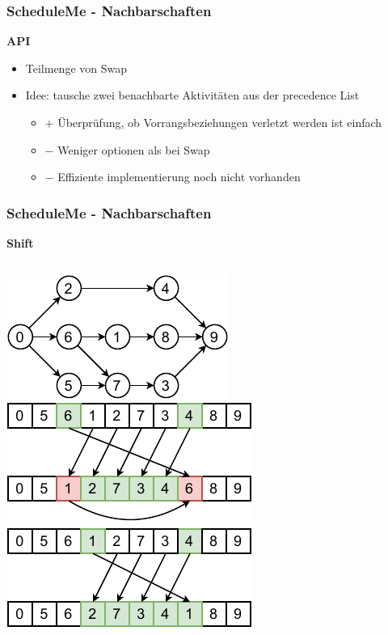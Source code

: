 \documentclass[aspectratio=169]{beamer}
\begin{document}

\begin{frame}
\frametitle{ScheduleMe - Nachbarschaften}
\textbf{API}
\begin{itemize}
	\item Teilmenge von Swap
	\item Idee: tausche zwei benachbarte Aktivitäten aus der precedence List
	\begin{itemize}
		\item $+$ Überprüfung, ob Vorrangsbeziehungen verletzt werden ist einfach
		\item $-$  Weniger optionen als bei Swap
		\item $-$  Effiziente implementierung noch nicht vorhanden
	\end{itemize}
\end{itemize}
\end{frame}


\begin{frame}
\frametitle{ScheduleMe - Nachbarschaften}
\textbf{Shift}
\begin{columns}[c] %
	\includegraphics[scale=1.3]{../images/tree.pdf}	
	\includegraphics[scale=1.2]{../images/shift0.pdf}
	\includegraphics[scale=1.2]{../images/shift1.pdf}	
\end{columns}
\end{frame}
\end{document}
